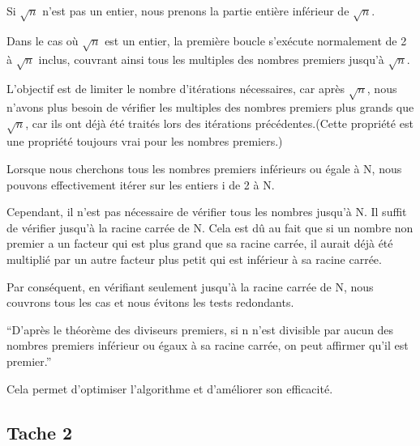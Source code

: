 \documentclass[
    ]{article}
\begin{document}
Si \(\sqrt{n}\) n'est pas un entier, nous prenons la partie entière
inférieur de \(\sqrt{n}\).

Dans le cas où \(\sqrt{n}\) est un entier, la première boucle s'exécute
normalement de 2 à \(\sqrt{n}\) inclus, couvrant ainsi tous les
multiples des nombres premiers jusqu'à \(\sqrt{n}\).

L'objectif est de limiter le nombre d'itérations nécessaires, car après
\(\sqrt{n}\), nous n'avons plus besoin de vérifier les multiples des
nombres premiers plus grands que \(\sqrt{n}\), car ils ont déjà été
traités lors des itérations précédentes.(Cette propriété est une
propriété toujours vrai pour les nombres premiers.)

Lorsque nous cherchons tous les nombres premiers inférieurs ou égale à
N, nous pouvons effectivement itérer sur les entiers i de 2 à N.

Cependant, il n'est pas nécessaire de vérifier tous les nombres jusqu'à
N. Il suffit de vérifier jusqu'à la racine carrée de N. Cela est dû au
fait que si un nombre non premier a un facteur qui est plus grand que sa
racine carrée, il aurait déjà été multiplié par un autre facteur plus
petit qui est inférieur à sa racine carrée.

Par conséquent, en vérifiant seulement jusqu'à la racine carrée de N,
nous couvrons tous les cas et nous évitons les tests redondants.

``D'après le théorème des diviseurs premiers, si n n'est divisible par
aucun des nombres premiers inférieur ou égaux à sa racine carrée, on
peut affirmer qu'il est premier.''

Cela permet d'optimiser l'algorithme et d'améliorer son efficacité.

\pagebreak

\hypertarget{tache-2}{%
\subsection{Tache 2}\label{tache-2}}
\end{document}
